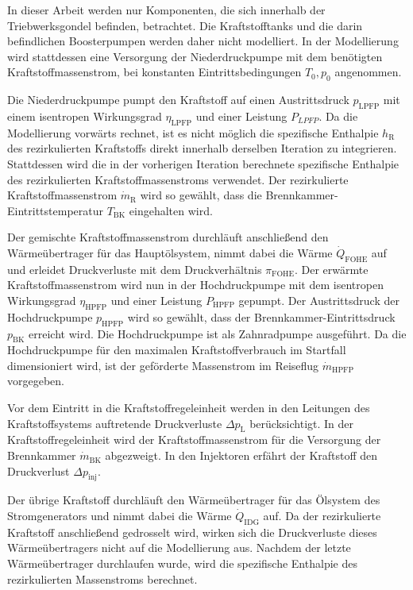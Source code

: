 In dieser Arbeit werden nur Komponenten, die sich innerhalb der Triebwerksgondel befinden, betrachtet. Die Kraftstofftanks und die darin befindlichen Boosterpumpen werden daher nicht modelliert. In der Modellierung wird stattdessen eine Versorgung der Niederdruckpumpe mit dem benötigten Kraftstoffmassenstrom, bei  konstanten Eintrittsbedingungen $T_0, p_0$ angenommen. 

Die Niederdruckpumpe pumpt den Kraftstoff auf einen Austrittsdruck $p_{\mathrm{LPFP}}$ mit einem isentropen Wirkungsgrad $\eta_{\mathrm{LPFP}}$ und einer Leistung $P_{LPFP}$. Da die Modellierung vorwärts rechnet, ist es nicht möglich die spezifische Enthalpie $h_\mathrm{R}$ des rezirkulierten Kraftstoffs direkt innerhalb derselben Iteration zu integrieren. Stattdessen wird die in der vorherigen Iteration berechnete spezifische Enthalpie des rezirkulierten Kraftstoffmassenstroms verwendet. Der rezirkulierte Kraftstoffmassenstrom $\dot{m}_\mathrm{R}$ wird so gewählt, dass die Brennkammer-Eintrittstemperatur $T_{\mathrm{BK}}$ eingehalten wird. 

Der gemischte Kraftstoffmassenstrom durchläuft anschließend den Wärmeübertrager für das Hauptölsystem, nimmt dabei die Wärme $\dot{Q}_{\mathrm{FOHE}}$ auf und erleidet Druckverluste mit dem Druckverhältnis $\pi_{\mathrm{FOHE}}$. Der erwärmte Kraftstoffmassenstrom wird nun in der Hochdruckpumpe mit dem isentropen Wirkungsgrad $\eta_{\mathrm{HPFP}}$ und einer Leistung $P_{\mathrm{HPFP}}$ gepumpt. Der Austrittsdruck der Hochdruckpumpe $p_{\mathrm{HPFP}}$ wird so gewählt, dass der Brennkammer-Eintrittsdruck $p_{\mathrm{BK}}$ erreicht wird. Die Hochdruckpumpe ist als Zahnradpumpe ausgeführt. Da die Hochdruckpumpe für den maximalen Kraftstoffverbrauch im Startfall dimensioniert wird, ist der geförderte Massenstrom im Reiseflug $\dot{m}_{\mathrm{HPFP}}$ vorgegeben. 

Vor dem Eintritt in die Kraftstoffregeleinheit werden in den Leitungen des Kraftstoffsystems auftretende Druckverluste $\Delta p_{\mathrm{L}}$  berücksichtigt. In der Kraftstoffregeleinheit wird der Kraftstoffmassenstrom für die Versorgung der Brennkammer $\dot{m}_{\mathrm{BK}}$ abgezweigt. In den Injektoren erfährt der Kraftstoff den Druckverlust $\Delta p_{\mathrm{inj}}$. 

Der übrige Kraftstoff durchläuft den Wärmeübertrager für das Ölsystem des Stromgenerators und nimmt dabei die Wärme $\dot{Q}_{\mathrm{IDG}}$ auf. Da der rezirkulierte Kraftstoff anschließend gedrosselt wird, wirken sich die Druckverluste dieses Wärmeübertragers nicht auf die Modellierung aus. Nachdem der letzte Wärmeübertrager durchlaufen wurde, wird die spezifische Enthalpie des rezirkulierten Massenstroms berechnet.

